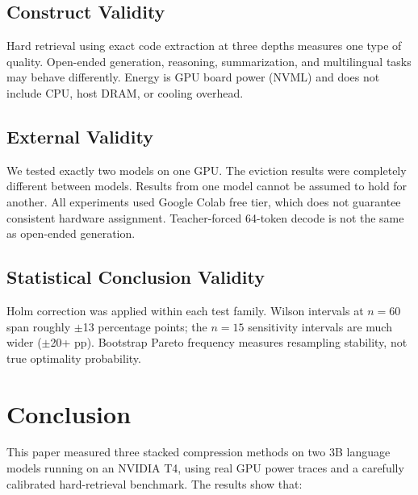 \documentclass[sigconf,nonacm]{acmart}
\begin{document}
\subsection{Construct Validity}
Hard retrieval using exact code extraction at three depths measures one type of
quality. Open-ended generation, reasoning, summarization, and multilingual tasks
may behave differently. Energy is GPU board power (NVML) and does not include CPU,
host DRAM, or cooling overhead.

\subsection{External Validity}
We tested exactly two models on one GPU. The eviction results were completely
different between models. Results from one model cannot be assumed to hold for
another. All experiments used Google Colab free tier, which does not guarantee
consistent hardware assignment. Teacher-forced 64-token decode is not the same as
open-ended generation.

\subsection{Statistical Conclusion Validity}
Holm correction was applied within each test family. Wilson intervals at $n = 60$
span roughly $\pm$13 percentage points; the $n = 15$ sensitivity intervals are
much wider ($\pm$20+ pp). Bootstrap Pareto frequency measures resampling stability,
not true optimality probability.


\section{Conclusion}

This paper measured three stacked compression methods on two 3B language models
running on an NVIDIA T4, using real GPU power traces and a carefully calibrated
hard-retrieval benchmark. The results show that:
\end{document}
